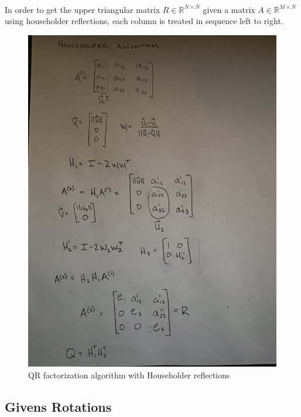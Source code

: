 \documentclass{article}
\begin{document}
\paragraph{}
In order to get the upper triangular matrix $R \in\mathbb{R}^{N\times{}N}$ given a matrix $A \in\mathbb{R}^{M\times{}N}$ using householder reflections, each column is treated in sequence left to right. 
\pagebreak
\begin{figure}[h]
\centering
\includegraphics[width=140mm, angle=-90]{Householder3}
\caption{QR factorization algorithm with Householder reflections}
\end{figure}

\subsection{Givens Rotations}
\end{document}
